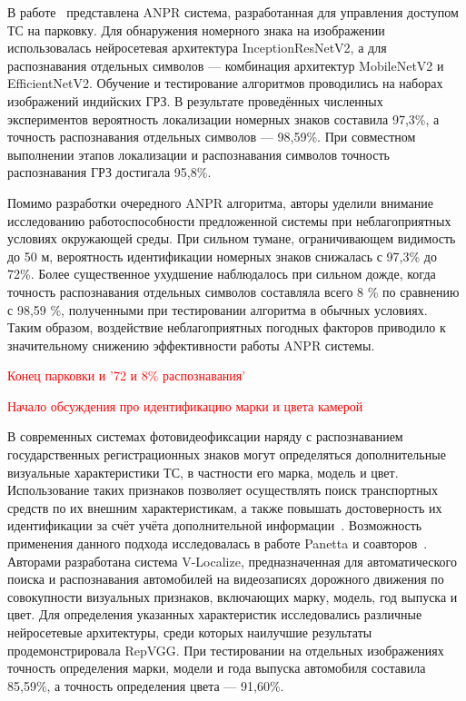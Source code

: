 \documentclass[12pt]{article}
\theoremstyle{definition}
\begin{document}
В работе~\cite{Advaith2026} представлена ANPR система, разработанная для управления доступом ТС на парковку. Для обнаружения номерного знака на изображении использовалась нейросетевая архитектура InceptionResNetV2, а для распознавания отдельных символов — комбинация архитектур MobileNetV2 и EfficientNetV2. Обучение и тестирование алгоритмов проводились на наборах изображений индийских ГРЗ. В результате проведённых численных экспериментов вероятность локализации номерных знаков составила 97,3\%, а точность распознавания отдельных символов — 98,59\%. При совместном выполнении этапов локализации и распознавания символов точность распознавания ГРЗ достигала 95,8\%.

Помимо разработки очередного ANPR алгоритма, авторы уделили внимание исследованию работоспособности предложенной системы при неблагоприятных условиях окружающей среды. При сильном тумане, ограничивающем видимость до 50 м, вероятность идентификации номерных знаков снижалась с 97,3\% до 72\%. Более существенное ухудшение наблюдалось при сильном дожде, когда точность распознавания отдельных символов составляла всего 8 \% по сравнению с 98,59 \%, полученными при тестировании алгоритма в обычных условиях. Таким образом, воздействие неблагоприятных погодных факторов приводило к значительному снижению эффективности работы ANPR системы.

\textcolor{red}{Конец парковки и '72 и 8\% распознавания'}

\textcolor{red}{Начало обсуждения про идентификацию марки и цвета камерой}

В современных системах фотовидеофиксации наряду с распознаванием государственных регистрационных знаков могут определяться дополнительные визуальные характеристики ТС, в частности его марка, модель и цвет. Использование таких признаков позволяет осуществлять поиск транспортных средств по их внешним характеристикам, а также повышать достоверность их идентификации за счёт учёта дополнительной информации~\cite{Sadiq2025, Gayen2024, Lima2024}. Возможность применения данного подхода исследовалась в работе Panetta и соавторов~\cite{Panetta2021}. Авторами разработана система V-Localize, предназначенная для автоматического поиска и распознавания автомобилей на видеозаписях дорожного движения по совокупности визуальных признаков, включающих марку, модель, год выпуска и цвет. Для определения указанных характеристик исследовались различные нейросетевые архитектуры, среди которых наилучшие результаты продемонстрировала RepVGG. При тестировании на отдельных изображениях точность определения марки, модели и года выпуска автомобиля составила 85,59\%, а точность определения цвета — 91,60\%.
\end{document}
